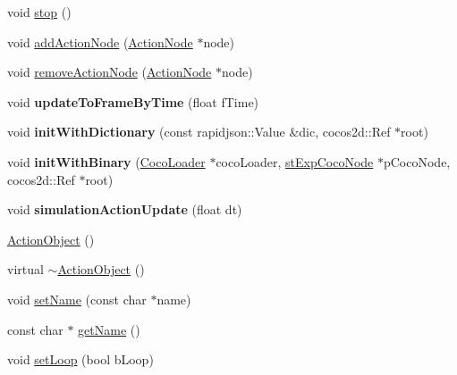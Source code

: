\begin{DoxyCompactItemize}
void \hyperlink{classcocostudio_1_1ActionObject_ad9616450d0b1c27499fc2ae17d1259be}{stop} ()
\item 
void \hyperlink{classcocostudio_1_1ActionObject_a8ab2a16c12741039440d78629bda657a}{add\+Action\+Node} (\hyperlink{classcocostudio_1_1ActionNode}{Action\+Node} $\ast$node)
\item 
void \hyperlink{classcocostudio_1_1ActionObject_a2923d174d80fb1a62749b32fdeb9b056}{remove\+Action\+Node} (\hyperlink{classcocostudio_1_1ActionNode}{Action\+Node} $\ast$node)
\item 
\mbox{\label{classcocostudio_1_1ActionObject_a58d7a6b9678f6e56aa210a5aaf4bcb5f}} 
void {\bfseries update\+To\+Frame\+By\+Time} (float f\+Time)
\item 
\mbox{\label{classcocostudio_1_1ActionObject_aa480973dc173a52d1ba126e4b5858fda}} 
void {\bfseries init\+With\+Dictionary} (const rapidjson\+::\+Value \&dic, cocos2d\+::\+Ref $\ast$root)
\item 
\mbox{\label{classcocostudio_1_1ActionObject_ab0f89c380631ddd77de76a7179920be1}} 
void {\bfseries init\+With\+Binary} (\hyperlink{classcocostudio_1_1CocoLoader}{Coco\+Loader} $\ast$coco\+Loader, \hyperlink{structcocostudio_1_1stExpCocoNode}{st\+Exp\+Coco\+Node} $\ast$p\+Coco\+Node, cocos2d\+::\+Ref $\ast$root)
\item 
\mbox{\label{classcocostudio_1_1ActionObject_a77106af52d905a519c10d1efbb747c5f}} 
void {\bfseries simulation\+Action\+Update} (float dt)
\item 
\hyperlink{classcocostudio_1_1ActionObject_a8078d816f95fa33f277ac43f730ff9b0}{Action\+Object} ()
\item 
virtual \hyperlink{classcocostudio_1_1ActionObject_ac843d687e85085763fd8c8b7c6db2278}{$\sim$\+Action\+Object} ()
\item 
void \hyperlink{classcocostudio_1_1ActionObject_a49c04b9506ebdc6dbb96d01d461140f5}{set\+Name} (const char $\ast$name)
\item 
const char $\ast$ \hyperlink{classcocostudio_1_1ActionObject_a29734f75e6995d590528cdf02ea6dafc}{get\+Name} ()
\item 
void \hyperlink{classcocostudio_1_1ActionObject_a188046afbabf20869af3aaef2762e4e2}{set\+Loop} (bool b\+Loop)
\item 

\end{DoxyCompactItemize}
